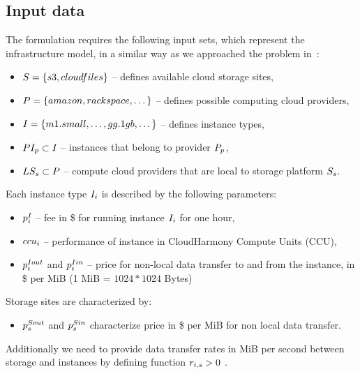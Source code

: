 {    \subsection{Input data}
     
    The formulation requires the following input sets, which represent the
    infrastructure model, in a similar way as we approached the problem in~\cite{Malawski-FGCS-13}:
    \begin{itemize}
        \item $S = \{s3, cloudfiles\}$ -- defines available cloud storage
        sites,
        \item $P = \{amazon, rackspace, \dotsc\}$ -- defines
        possible computing cloud providers,
        \item $I = \{m1.small, \dots, gg.1gb, \dotsc\}$ -- defines
        instance types,
        \item $PI_{p} \subset I$ -- instances that
        belong to provider $P_p$,
        \item $LS_{s} \subset P$ -- compute cloud providers
        that are local to storage platform $S_s$.
    \end{itemize}        
        
    Each instance type $I_i$ is described by the following parameters:
    \begin{itemize}
        \item $p^I_i$ -- fee in \$ for running instance $I_i$
        for one hour,
        \item $ccu_i$ -- performance of instance in CloudHarmony Compute Units
        (CCU),
        \item $p^{Iout}_i$ and $p^{Iin}_i$ --
        price for non-local data transfer to and from the instance, in \$ per
        MiB (1 MiB = $1024*1024$ Bytes)
    \end{itemize}
    
    Storage sites are characterized by:
    \begin{itemize}
        \item $p^{Sout}_s$ and $p^{Sin}_s$
        characterize price in \$ per MiB for non local data transfer.
    \end{itemize}
    
    Additionally we need to provide data transfer rates in MiB per second between
    storage and instances by defining function $r_{i,s} > 0$ .
    
}
